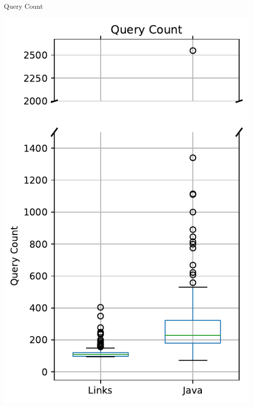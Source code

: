 \documentclass[11.5pt, aspectratio=169]{beamer}
\begin{document}
\begin{frame}{Query Count}

  \begin{minipage}[t]{0.45\textwidth}
    \centering
    \includegraphics[scale=0.4]{images/objectdisplay_querycount_box.pdf}


\end{minipage}
\end{frame}
\end{document}
